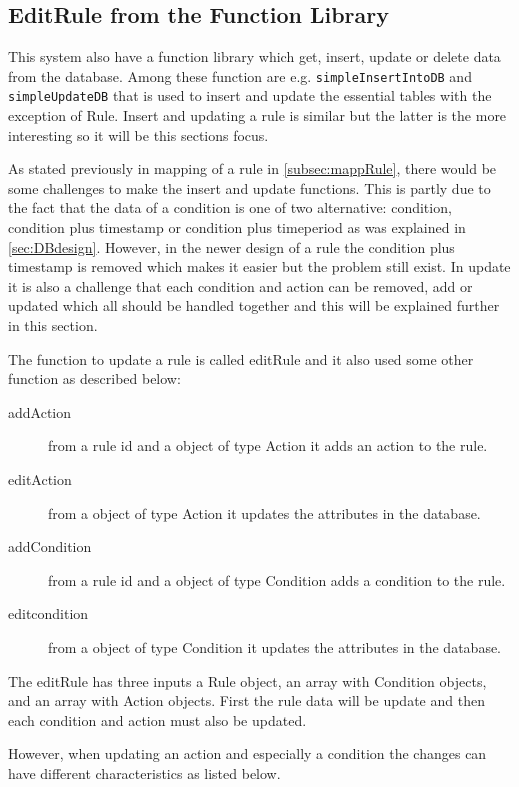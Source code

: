 \subsection{EditRule from the Function Library}
\label{subsec:dbRule}
This system also have a function library which get, insert, update or delete data from the database. Among these function are e.g. \texttt{simpleInsertIntoDB} and \texttt{simpleUpdateDB} that is used to insert and update the essential tables with the exception of Rule. Insert and updating a rule is similar but the latter is the more interesting so it will be this sections focus. 

As stated previously in mapping of a rule in \vref{subsec:mappRule}, there would be some challenges to make the insert and update functions. This is partly due to the fact that the data of a condition  is one of two alternative: condition, condition plus timestamp  or condition plus timeperiod as was explained in \vref{sec:DBdesign}. However, in the newer design of a rule the condition plus timestamp is removed which makes it easier but the problem still exist. In update it is also a challenge that each condition and action can be removed, add or updated which all should be handled together and this will be explained further in this section. 

The function to update a rule is called editRule and it also used some other function as described below:

\begin{description}
	\item[addAction] from a rule id and a object of type Action it adds an action to the rule.
	\item[editAction] from a object of type Action it updates the attributes in the database.   
	\item[addCondition] from a rule id and a object of type Condition adds a condition to the rule.
	\item[editcondition] from a object of type Condition it updates the attributes in the database.   
\end{description}

The editRule has three inputs a Rule object, an array with Condition objects, and an array with Action objects. First the rule data will be update and then each condition and action must also be updated. 

However, when updating an action and especially a condition the changes can have different characteristics as listed below.

